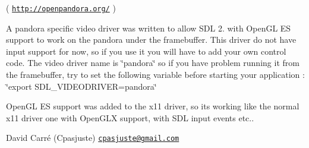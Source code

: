 ( \href{http://openpandora.org/}{\tt http\+://openpandora.\+org/} )
\begin{DoxyItemize}
\item A pandora specific video driver was written to allow S\+DL 2. with Open\+GL ES support to work on the pandora under the framebuffer. This driver do not have input support for now, so if you use it you will have to add your own control code. The video driver name is \char`\"{}pandora\char`\"{} so if you have problem running it from the framebuffer, try to set the following variable before starting your application \+: \char`\"{}export S\+D\+L\+\_\+\+V\+I\+D\+E\+O\+D\+R\+I\+V\+E\+R=pandora\char`\"{}
\item Open\+GL ES support was added to the x11 driver, so it\textquotesingle{}s working like the normal x11 driver one with Open\+G\+LX support, with S\+DL input event\textquotesingle{}s etc..
\end{DoxyItemize}

David Carré (Cpasjuste) \href{mailto:cpasjuste@gmail.com}{\tt cpasjuste@gmail.\+com} 